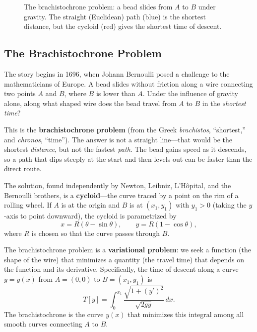 \begin{figure}[htbp]
\centering
{}
\caption{The brachistochrone problem: a bead slides from $A$ to $B$ under gravity. The straight (Euclidean) path (blue) is the shortest distance, but the cycloid (red) gives the shortest time of descent.}
\label{fig:brachistochrone}
\end{figure}

\subsection{The Brachistochrone Problem}

The story begins in 1696, when Johann Bernoulli posed a challenge to the mathematicians of Europe. A bead slides without friction along a wire connecting two points $A$ and $B$, where $B$ is lower than $A$. Under the influence of gravity alone, along what shaped wire does the bead travel from $A$ to $B$ in the \emph{shortest time}?

This is the \textbf{brachistochrone problem} (from the Greek \emph{brachistos}, ``shortest,'' and \emph{chronos}, ``time''). The answer is not a straight line---that would be the shortest \emph{distance}, but not the fastest \emph{path}. The bead gains speed as it descends, so a path that dips steeply at the start and then levels out can be faster than the direct route.

The solution, found independently by Newton, Leibniz, L'H\^opital, and the Bernoulli brothers, is a \textbf{cycloid}---the curve traced by a point on the rim of a rolling wheel. If $A$ is at the origin and $B$ is at $(x_1, y_1)$ with $y_1 > 0$ (taking the $y$-axis to point downward), the cycloid is parametrized by
\[
    x = R(\theta - \sin\theta), \qquad y = R(1 - \cos\theta),
\]
where $R$ is chosen so that the curve passes through $B$.

The brachistochrone problem is a \textbf{variational problem}: we seek a function (the shape of the wire) that minimizes a quantity (the travel time) that depends on the function and its derivative. Specifically, the time of descent along a curve $y = y(x)$ from $A = (0,0)$ to $B = (x_1, y_1)$ is
\[
    T[y] = \int_0^{x_1} \frac{\sqrt{1 + (y')^2}}{\sqrt{2gy}} \, dx.
\]
The brachistochrone is the curve $y(x)$ that minimizes this integral among all smooth curves connecting $A$ to $B$.

